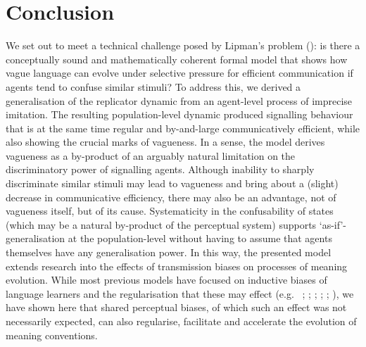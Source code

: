 \documentclass[11pt,english]{article}
\numberwithin{equation}{section}
\newcommand{\citealtbjps}[1]{\citeauthor{#1} \citeyear{#1}}
\newcommand{\citeyearparbjps}[1]{(\citeyear{#1})}
\begin{document}

\section{Conclusion}
\label{sec:conclusion}

We set out to meet a technical challenge posed by Lipman's problem
\citeyearparbjps{Lipman2009:Why-is-Language}: is there a conceptually sound and mathematically coherent
formal model that shows how vague language can evolve under selective pressure for efficient
communication if agents tend to confuse similar stimuli? To address this, we derived a
generalisation of the replicator dynamic from an agent-level process of imprecise
imitation. The resulting population-level dynamic produced signalling behaviour that is at the
same time regular and by-and-large communicatively efficient, while also showing the crucial
marks of vagueness. In a sense, the model derives vagueness as a by-product of an arguably
natural limitation on the discriminatory power of signalling agents.  Although inability to
sharply discriminate similar stimuli may lead to vagueness and bring about a (slight) decrease
in communicative efficiency, there may also be an advantage, not of vagueness itself, but of
its cause. Systematicity in the confusability of states (which may be a natural by-product of
the perceptual system) supports `as-if'-generalisation at the population-level without
having to assume that agents themselves have any generalisation power. In this way, the
presented model extends research into the effects of transmission biases on processes of
meaning evolution. While most previous models have focused on inductive biases of language
learners and the regularisation that these may effect
(e.g.~\citealtbjps{NowakPlotkin2000:The-Evolution-o}; \citealtbjps{NowakKomarova2001:Evolution-of-Un}; \citealtbjps{KirbyHurford2002:The-Emergence-o}; \citealtbjps{SmithKirby2003:Iterated-Learni}; \citealtbjps{GriffithsKalish2007:Language-Evolut}; \citealtbjps{KirbyGriffith2014:Iterated-Learni}),
we have shown here that shared perceptual biases, of which such an effect was not necessarily
expected, can also regularise, facilitate and accelerate the evolution of meaning conventions.


\end{document}
